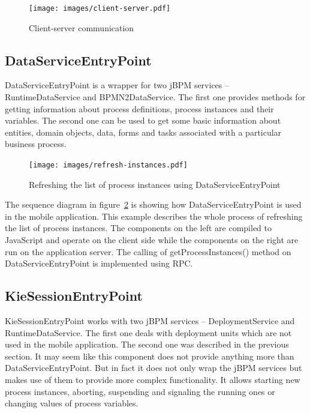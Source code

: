 \documentclass[12pt,oneside,final]{fithesis2}
\begin{document}
\begin{figure}[ht!]
\centering
\texttt{[image: images/client-server.pdf]}
\caption{Client-server communication}
\label{fig:client-server}
\end{figure}

\label{sec:reused-components}
\subsection{DataServiceEntryPoint}

DataServiceEntryPoint is a wrapper for two jBPM services -- RuntimeDataService and BPMN2DataService.
The first one provides methods for getting information about process definitions, process instances and their variables.
The second one can be used to get some basic information about entities, domain objects, data, forms and tasks associated with a particular business process.

\begin{figure}[ht!]
\centering
\texttt{[image: images/refresh-instances.pdf]}
\caption{Refreshing the list of process instances using DataServiceEntryPoint}
\label{fig:refresh-instances}
\end{figure}

The sequence diagram in figure~\ref{fig:refresh-instances} is showing how DataServiceEntryPoint is used in the mobile application.
This example describes the whole process of refreshing the list of process instances.
The components on the left are compiled to JavaScript and operate on the client side while the components on the right are run on the application server.
The calling of getProcessInstances() method on DataServiceEntryPoint is implemented using RPC.

\subsection{KieSessionEntryPoint}

KieSessionEntryPoint works with two jBPM services -- DeploymentService and RuntimeDataService.
The first one deals with deployment units which are not used in the mobile application.
The second one was described in the previous section.
It may seem like this component does not provide anything more than DataServiceEntryPoint.
But in fact it does not only wrap the jBPM services but makes use of them to provide more complex functionality.
It allows starting new process instances, aborting, suspending and signaling the running ones or changing values of process variables.
\end{document}
